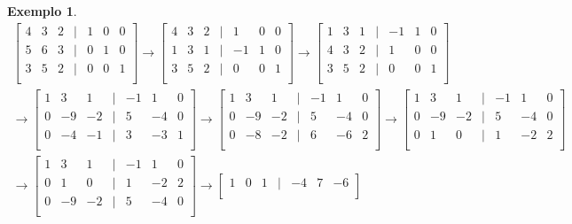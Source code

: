\documentclass{article}
\newtheorem*{example}{Exemplo}
\begin{document}
\begin{example}
	\begin{align*}
	\begin{bmatrix}
	4 & 3 & 2 & | & 1 & 0 & 0 \\
	5 & 6 & 3 & | & 0 & 1 & 0 \\
	3 & 5 & 2 & | & 0 & 0 & 1 \\
	\end{bmatrix}\to\begin{bmatrix}
	4 & 3 & 2 & | & 1 & 0 & 0 \\
	1 & 3 & 1 & | & -1 & 1 & 0 \\
	3 & 5 & 2 & | & 0 & 0 & 1 \\
	\end{bmatrix}\to\begin{bmatrix}
	1 & 3 & 1 & | & -1 & 1 & 0 \\
	4 & 3 & 2 & | & 1 & 0 & 0 \\
	3 & 5 & 2 & | & 0 & 0 & 1 \\
	\end{bmatrix} \\
	\to\begin{bmatrix}
	1 & 3 & 1 & | & -1 & 1 & 0 \\
	0 & -9 & -2 & | & 5 & -4 & 0 \\
	0 & -4 & -1 & | & 3 & -3 & 1 \\
	\end{bmatrix}\to\begin{bmatrix}
	1 & 3 & 1 & | & -1 & 1 & 0 \\
	0 & -9 & -2 & | & 5 & -4 & 0 \\
	0 & -8 & -2 & | & 6 & -6 & 2 \\
	\end{bmatrix}\to\begin{bmatrix}
	1 & 3 & 1 & | & -1 & 1 & 0 \\
	0 & -9 & -2 & | & 5 & -4 & 0 \\
	0 & 1 & 0 & | & 1 & -2 & 2 \\
	\end{bmatrix} \\
	\to\begin{bmatrix}
	1 & 3 & 1 & | & -1 & 1 & 0 \\
	0 & 1 & 0 & | & 1 & -2 & 2 \\
	0 & -9 & -2 & | & 5 & -4 & 0 \\
	\end{bmatrix}\to\begin{bmatrix}
	1 & 0 & 1 & | & -4 & 7 & -6 \\

\end{bmatrix}
\end{align*}
\end{example}
\end{document}
